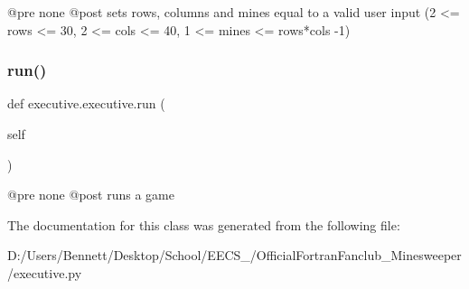 \begin{DoxyVerb}@pre none
@post sets rows, columns and mines equal to a valid user input (2 <= rows <= 30, 2 <= cols <= 40, 1 <= mines <= rows*cols -1)
\end{DoxyVerb}
 \mbox{\label{classexecutive_1_1executive_abe92cddf119081cac6c747858df061d7}} 
\subsubsection{\texorpdfstring{run()}{run()}}
{\footnotesize\ttfamily def executive.\+executive.\+run (\begin{DoxyParamCaption}\item[{}]{self }\end{DoxyParamCaption})}

\begin{DoxyVerb}@pre none
@post runs a game
\end{DoxyVerb}
 

The documentation for this class was generated from the following file\+:\begin{DoxyCompactItemize}
\item 
D\+:/\+Users/\+Bennett/\+Desktop/\+School/\+E\+E\+C\+S\+\_/\+Official\+Fortran\+Fanclub\+\_\+\+Minesweeper/executive.\+py\end{DoxyCompactItemize}
